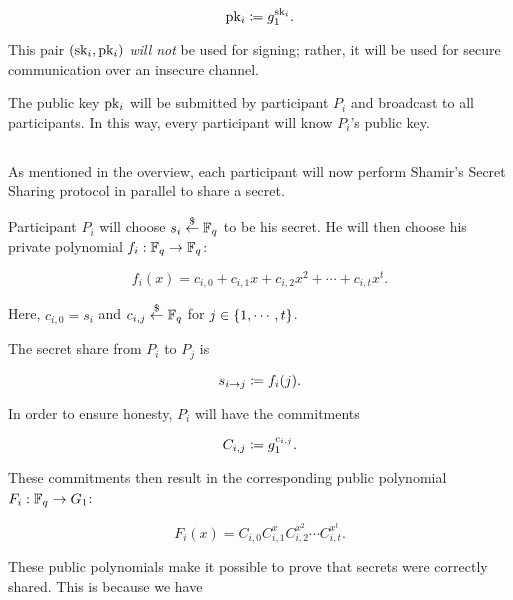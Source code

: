 \begin{equation}
    \textrm{pk}{}_{i} \coloneqq{} g_{1}^{\textrm{sk}{}_{i}}.
\end{equation}

\noindent
This pair $\left( \textrm{sk}{}_{i},\textrm{pk}{}_{i} \right)$ \emph{will not}
be used for signing;
rather, it will be used for secure communication over
an \gls{insecure channel}.

The public key $\textrm{pk}{}_{i}$ will be submitted by participant $P_{i}$
and broadcast to all participants.
In this way, every participant will know $P_{i}$'s public key.

\subsection{\ShareSubmission{}}
\label{ssec:secret_dkg_share_submission}

As mentioned in the overview, each participant will now perform
Shamir's Secret Sharing protocol in parallel to share a secret.

Participant $P_{i}$ will choose $s_{i}\stackrel{\$}{\leftarrow}{}\mathbb{F}_{q}$ to be his secret.
He will then choose his private polynomial
$f_{i}:\mathbb{F}_{q}\to\mathbb{F}_{q}$:

\begin{equation}
    f_{i}(x) = c_{i,0} + c_{i,1}x + c_{i,2}x^{2} + \cdots + c_{i,t}x^{t}.
    \label{eq:dkg_private_poly}
\end{equation}

\noindent
Here, $c_{i,0} = s_{i}$ and $c_{i,j}\stackrel{\$}{\leftarrow}{}\mathbb{F}_{q}$
for $j\in\left\{ 1,\cdots,t \right\}$.

The secret share from $P_{i}$ to $P_{j}$ is

\begin{equation}
    s_{i\to j} \coloneqq{} f_{i}(j).
\end{equation}

\noindent
In order to ensure honesty, $P_{i}$ will have the commitments

\begin{equation}
    C_{i,j} \coloneqq{} g_{1}^{c_{i,j}}.
\end{equation}

\noindent
These commitments then result in the corresponding public polynomial
$F_{i}:\mathbb{F}_{q}\to G_{1}$:

\begin{equation}
    F_{i}(x) = C_{i,0}C_{i,1}^{x}C_{i,2}^{x^{2}} \cdots C_{i,t}^{x^{t}}.
\end{equation}

\noindent
These public polynomials make it possible to prove that secrets
were correctly shared.
This is because we have

